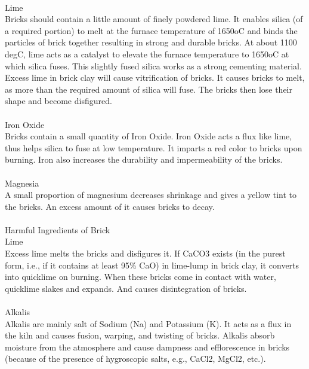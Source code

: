 \vspace{0.1cm}\\
Lime\\
Bricks should contain a little amount of finely powdered lime. It enables silica (of a required portion) to melt at the furnace temperature of 1650oC and binds the particles of brick together resulting in strong and durable bricks. At about 1100 degC, lime acts as a catalyst to elevate the furnace temperature to 1650oC at which silica fuses. This slightly fused silica works as a strong cementing material. Excess lime in brick clay will cause vitrification of bricks. It causes bricks to melt, as more than the required amount of silica will fuse. The bricks then lose their shape and become disfigured.\\
\vspace{0.1cm}\\
Iron Oxide\\
Bricks contain a small quantity of Iron Oxide. Iron Oxide acts a flux like lime, thus helps silica to fuse at low temperature. It imparts a red color to bricks upon burning. Iron also increases the durability and impermeability of the bricks.\\
\vspace{0.1cm}\\
Magnesia\\
A small proportion of magnesium decreases shrinkage and gives a yellow tint to the bricks. An excess amount of it causes bricks to decay.\\
\vspace{0.1cm}\\
Harmful Ingredients of Brick\\
Lime\\
Excess lime melts the bricks and disfigures it. If CaCO3 exists (in the purest form, i.e., if it contains at least 95\% CaO) in lime-lump in brick clay, it converts into quicklime on burning. When these bricks come in contact with water, quicklime slakes and expands. And causes disintegration of bricks.\\
\vspace{0.1cm}\\
Alkalis\\
Alkalis are mainly salt of Sodium (Na) and Potassium (K). It acts as a flux in the kiln and causes fusion, warping, and twisting of bricks. Alkalis absorb moisture from the atmosphere and cause dampness and efflorescence in bricks (because of the presence of hygroscopic salts, e.g., CaCl2, MgCl2, etc.).\\
